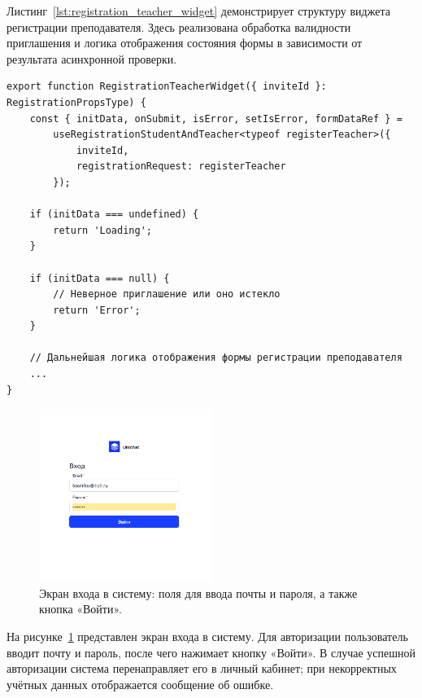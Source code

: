 Листинг~\ref{lst:registration_teacher_widget} демонстрирует структуру виджета регистрации преподавателя. Здесь реализована обработка валидности приглашения и логика отображения состояния формы в зависимости от результата асинхронной проверки.

\begin{lstlisting}[caption={Виджет регистрации преподавателя}, label={lst:registration_teacher_widget}]
export function RegistrationTeacherWidget({ inviteId }: RegistrationPropsType) {
    const { initData, onSubmit, isError, setIsError, formDataRef } =
        useRegistrationStudentAndTeacher<typeof registerTeacher>({
            inviteId,
            registrationRequest: registerTeacher
        });

    if (initData === undefined) {
        return 'Loading';
    }

    if (initData === null) {
        // Неверное приглашение или оно истекло
        return 'Error';
    }

    // Дальнейшая логика отображения формы регистрации преподавателя
    ...
}
\end{lstlisting}

\begin{figure}[h]
    \centering
    \includegraphics[width=0.5\textwidth]{static/presintation/LoginPage.png} %
    \caption{Экран входа в систему: поля для ввода почты и пароля, а также кнопка «Войти».}
    \label{fig:login_page}
\end{figure}

На рисунке~\ref{fig:login_page} представлен экран входа в систему. Для авторизации пользователь вводит почту и пароль, после чего нажимает кнопку «Войти». В случае успешной авторизации система перенаправляет его в личный кабинет; при некорректных учётных данных отображается сообщение об ошибке.


